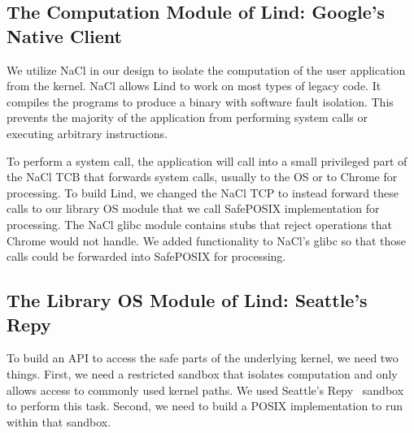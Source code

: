 \subsection{The Computation Module of Lind: Google's Native Client}

We utilize NaCl in our design to isolate the computation of the user application 
from the kernel.
NaCl allows Lind to work on most types of legacy code.
It compiles the programs to produce a binary with software fault isolation.
This prevents the majority of the application from performing system calls
or executing arbitrary instructions.

To perform a system call, the application will call into a small privileged
part of the NaCl TCB that forwards system calls, usually to the OS or to Chrome for
processing. To build Lind, we changed the NaCl TCP to
instead forward these calls to our library OS module that we call SafePOSIX implementation
for processing. The NaCl
glibc module contains stubs that reject operations
that Chrome would not handle.  We added functionality to NaCl's glibc so that
those calls could be forwarded into SafePOSIX for processing.

%

\subsection{The Library OS Module of Lind: Seattle's Repy}

To build an API to access the safe parts of the underlying kernel, we need
two things.  First, we need a restricted sandbox that isolates computation
and only allows access to commonly used kernel paths.  We used
Seattle's Repy~\cite{Repy-10} sandbox to perform this task.
Second, we need to build a POSIX implementation to run within that sandbox.

